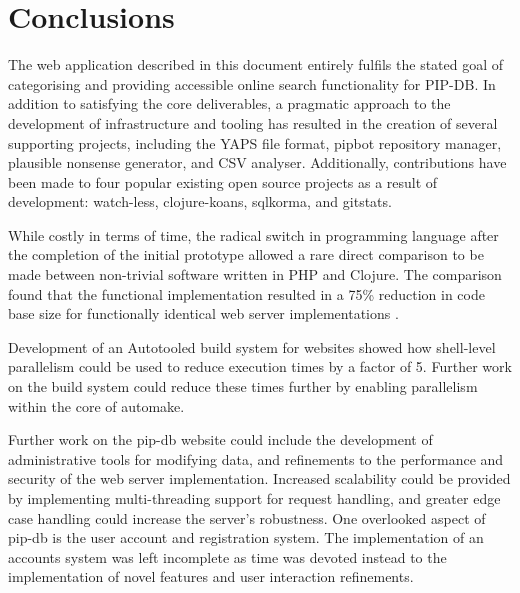 \chapter{Conclusions}\label{chap:conclusions}


The web application described in this document entirely fulfils the
stated goal of categorising and providing accessible online search
functionality for PIP-DB. In addition to satisfying the core
deliverables, a pragmatic approach to the development of
infrastructure and tooling has resulted in the creation of several
supporting projects, including the YAPS file format, pipbot repository
manager, plausible nonsense generator, and CSV analyser. Additionally,
contributions have been made to four popular existing open source
projects as a result of development: watch-less, clojure-koans,
sqlkorma, and gitstats.

While costly in terms of time, the radical switch in programming
language after the completion of the initial prototype allowed a rare
direct comparison to be made between non-trivial software written in
PHP and Clojure. The comparison found that the functional
implementation resulted in a 75\% reduction in code base size for
functionally identical web server implementations
\cite{cummins2014migrating}.

Development of an Autotooled build system for websites showed how
shell-level parallelism could be used to reduce execution times by a
factor of 5. Further work on the build system could reduce these times
further by enabling parallelism within the core of automake.

Further work on the pip-db website could include the development of
administrative tools for modifying data, and refinements to the
performance and security of the web server implementation. Increased
scalability could be provided by implementing multi-threading support
for request handling, and greater edge case handling could increase
the server's robustness. One overlooked aspect of pip-db is the user
account and registration system. The implementation of an accounts
system was left incomplete as time was devoted instead to the
implementation of novel features and user interaction refinements.


